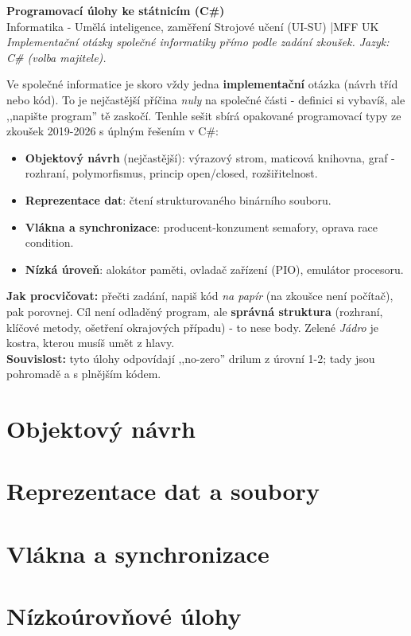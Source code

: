 \documentclass[11pt]{article}
\begin{document}
\begin{center}
  {\LARGE\bfseries\color{mffblue} Programovací úlohy ke státnicím (C\#)}\\[4pt]
  {\small Informatika - Umělá inteligence, zaměření Strojové učení (UI-SU) \quad|\quad MFF UK}\\[2pt]
  {\footnotesize\itshape Implementační otázky společné informatiky přímo podle zadání zkoušek. Jazyk: C\# (volba majitele).}
\end{center}

\begin{infobox}[title={Proč zvlášť a jak to číst}]
\footnotesize
Ve společné informatice je skoro vždy jedna \textbf{implementační} otázka (návrh tříd nebo kód). To je nejčastější příčina \emph{nuly} na společné části - definici si vybavíš, ale ,,napište program'' tě zaskočí. Tenhle sešit sbírá opakované programovací typy ze zkoušek 2019-2026 s úplným řešením v C\#:
\begin{itemize}\setlength{\itemsep}{1pt}
  \item \textbf{Objektový návrh} (nejčastější): výrazový strom, maticová knihovna, graf - rozhraní, polymorfismus, princip open/closed, rozšiřitelnost.
  \item \textbf{Reprezentace dat}: čtení strukturovaného binárního souboru.
  \item \textbf{Vlákna a synchronizace}: producent-konzument semafory, oprava race condition.
  \item \textbf{Nízká úroveň}: alokátor paměti, ovladač zařízení (PIO), emulátor procesoru.
\end{itemize}
\textbf{Jak procvičovat:} přečti zadání, napiš kód \emph{na papír} (na zkoušce není počítač), pak porovnej. Cíl není odladěný program, ale \textbf{správná struktura} (rozhraní, klíčové metody, ošetření okrajových případu) - to nese body. Zelené \emph{Jádro} je kostra, kterou musíš umět z hlavy.\\
\textbf{Souvislost:} tyto úlohy odpovídají ,,no-zero'' drilum z úrovní 1-2; tady jsou pohromadě a s plnějším kódem.
\end{infobox}

\tableofcontents
\bigskip

\section{Objektový návrh}




\section{Reprezentace dat a soubory}


\section{Vlákna a synchronizace}


\section{Nízkoúrovňové úlohy}



\end{document}
